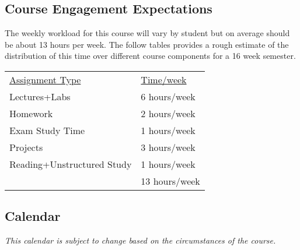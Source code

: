 \documentclass[10pt]{article}
\begin{document}
\subsection{Course Engagement Expectations}

The weekly workload for this course will vary by student but on average should be about 13 hours per week.  The follow tables provides a rough estimate of the distribution of this time over different course components for a 16 week semester.
\begin{center}
\begin{tabular}{ll}
\underline{Assignment Type} & \underline{Time/week} \\
Lectures+Labs       & 6 hours/week \\
Homework          & 2 hours/week \\
Exam Study Time    & 1 hours/week \\
Projects          & 3 hours/week \\
Reading+Unstructured Study &  1 hours/week \\
\bottomrule
 & 13 hours/week
\end{tabular}
\end{center}


\subsection{Calendar}

\textit{This calendar is subject to change based on the circumstances of the course.}
\end{document}

